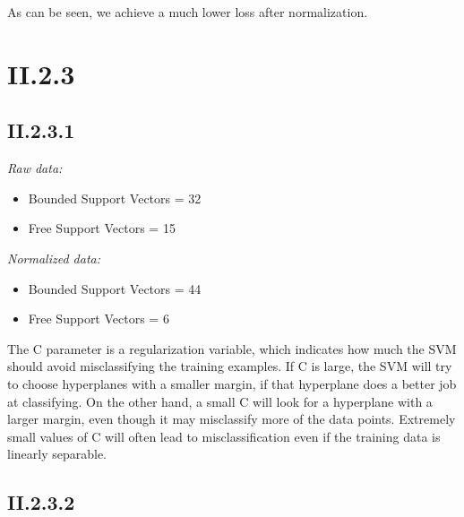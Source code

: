 \documentclass[12pt, a4paper]{article}
\begin{document}
As can be seen, we achieve a much lower loss after normalization.

\section{II.2.3}

\subsection{II.2.3.1}

\textit{Raw data:}
\begin{itemize}
	\item Bounded Support Vectors = 32
	\item Free Support Vectors = 15
\end{itemize}

\textit{Normalized data:}
\begin{itemize}
	\item Bounded Support Vectors = 44
	\item Free Support Vectors = 6
\end{itemize}

The C parameter is a regularization variable, which indicates how much the SVM should avoid misclassifying the training examples. If C is large, the SVM will try to choose hyperplanes with a smaller margin, if that hyperplane does a better job at classifying. On the other hand, a small C will look for a hyperplane with a larger margin, even though it may misclassify more of the data points. Extremely small values of C will often lead to misclassification even if the training data is linearly separable.

\subsection{II.2.3.2}
\end{document}
